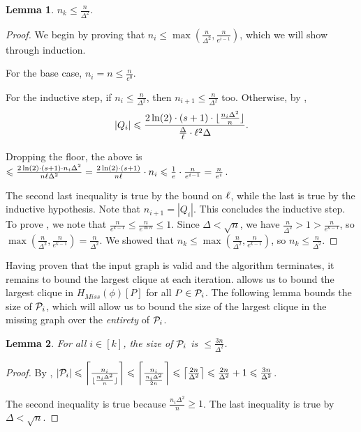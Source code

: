 \documentclass[11pt]{article}
\newtheorem{lemma}{Lemma}[section]
\theoremstyle{definition}
\renewcommand{\leq}{\leqslant}
\renewcommand{\geq}{\geqslant}
\renewcommand{\le}{\leq}
\renewcommand{\ge}{\geq}
\begin{document}
\begin{lemma}\label{algorithm-finishes}
$n_k\le \frac n{\Delta^2}$. 
\end{lemma}
\begin{proof}
    We begin by proving that $n_i\le \max(\frac n{\Delta^2}, \frac{n}{e^{i-1}})$, which we will show through induction.

    For the base case, $n_i=n\le\frac n{e^0}$. 

    For the inductive step, if $n_i\le \frac n{\Delta^2}$, then $n_{i+1}\le \frac n{\Delta^2}$ too. Otherwise, by , 
    \begin{align*}
        |Q_i|\le\frac{2\ln(2)\cdot(s+1)\cdot\lfloor \frac{n_i\Delta^2}{n}\rfloor}{\frac{\Delta}{\distribFac}\cdot {\distribFac}^2\Delta}.
    \end{align*}

    Dropping the floor, the above is $\le \frac{2\ln(2)\cdot (s+1)\cdot n_i\Delta^2}{n{\distribFac}\Delta^2}=\frac{2\ln(2)\cdot(s+1)}{n{\distribFac}}\cdot n_i\le \frac 1e\cdot \frac n{e^{i-1}}=\frac n{e^i}$. 

    The second last inequality is true by the bound on ${\ell}$, while the last is true by the inductive hypothesis. Note that $n_{i+1}=|Q_i|$. This concludes the inductive step. \\
    
    To prove , we note that $\frac n{e^{k-1}}\le \frac n{e^{\ln n}}\le 1$. Since $\Delta < \sqrt n$, we have $\frac n{\Delta^2}>1>\frac n{e^{k-1}}$, so $\max\left(\frac n{\Delta^2}, \frac n{e^{k-1}}\right)=\frac n{\Delta^2}$. We showed that $n_k\le\max\left(\frac n{\Delta^2}, \frac n{e^{k-1}}\right)$, so $n_k\le \frac n{\Delta^2}$.
\end{proof}

Having proven that the input graph is valid and the algorithm terminates, it remains to bound the largest clique at each iteration.  allows us to bound the largest clique in $H_{Miss}(\phi)[P]$ for all $P\in \mathcal{P}_i$. The following lemma bounds the size of $\mathcal{P}_i$, which will allow us to bound the size of the largest clique in the missing graph over the \textit{entirety} of $\mathcal{P}_i$. 

\begin{lemma}\label{bound-on-P_i}
For all $i\in [k]$, the size of $\mathcal{P}_i$ is $\le \frac{3n}{\Delta^2}$. 
\end{lemma}
\begin{proof}
By , $|\CP_i|\le\left\lceil\frac{n_i}{\lfloor\frac{n_i\Delta^2}n\rfloor}\right\rceil\le\left\lceil\frac{n_i}{\frac{n_i\Delta^2}{2n}}\right\rceil\le\left\lceil \frac{2n}{\Delta^2}\right\rceil\le\frac{2n}{\Delta^2}+1\le\frac{3n}{\Delta^2}$. 

The second inequality is true because $\frac{n_i\Delta^2}n\ge 1$. The last inequality is true by $\Delta<\sqrt n$. 
\end{proof}
\end{document}
